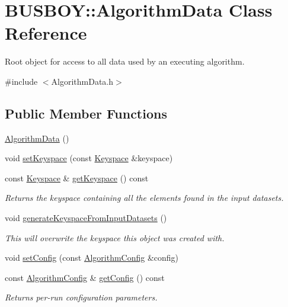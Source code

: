 \hypertarget{classBUSBOY_1_1AlgorithmData}{
\section{BUSBOY::AlgorithmData Class Reference}
\label{classBUSBOY_1_1AlgorithmData}
}


Root object for access to all data used by an executing algorithm.  


{\ttfamily \#include $<$AlgorithmData.h$>$}\subsection*{Public Member Functions}
\begin{DoxyCompactItemize}
\item 
\hyperlink{classBUSBOY_1_1AlgorithmData_a8f34fd577e01b28d2b3f5b8ede2d6b75}{AlgorithmData} ()
\item 
void \hyperlink{classBUSBOY_1_1AlgorithmData_a61bf70552f02dc84dbb7bce343a090e8}{setKeyspace} (const \hyperlink{classBUSBOY_1_1Keyspace}{Keyspace} \&keyspace)
\item 
const \hyperlink{classBUSBOY_1_1Keyspace}{Keyspace} \& \hyperlink{classBUSBOY_1_1AlgorithmData_add1317dede984946bab40e3fb541deeb}{getKeyspace} () const 
\begin{DoxyCompactList}\small\item\em Returns the keyspace containing all the elements found in the input datasets. \item\end{DoxyCompactList}\item 
void \hyperlink{classBUSBOY_1_1AlgorithmData_a8d530109cffd59b9274dbe9890173446}{generateKeyspaceFromInputDatasets} ()
\begin{DoxyCompactList}\small\item\em This will overwrite the keyspace this object was created with. \item\end{DoxyCompactList}\item 
void \hyperlink{classBUSBOY_1_1AlgorithmData_af41ce6bd179d7632c45a612512104694}{setConfig} (const \hyperlink{classBUSBOY_1_1AlgorithmConfig}{AlgorithmConfig} \&config)
\item 
const \hyperlink{classBUSBOY_1_1AlgorithmConfig}{AlgorithmConfig} \& \hyperlink{classBUSBOY_1_1AlgorithmData_ad7d54667699f4db65b9bfa32e2d8f21b}{getConfig} () const 
\begin{DoxyCompactList}\small\item\em Returns per-\/run configuration parameters. \item\end{DoxyCompactList}\item 

\end{DoxyCompactItemize}
